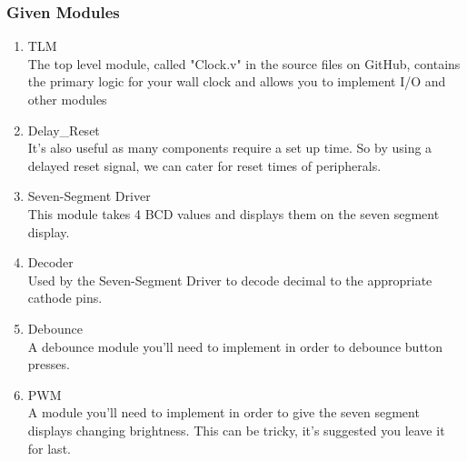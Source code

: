 \subsubsection{Given Modules}
\begin{enumerate}
    \item TLM\\
    The top level module, called "Clock.v" in the source files on GitHub, contains the primary logic for your wall clock and allows you to implement I/O and other modules
    \item Delay\_Reset\\
     It's also useful as many components require a set up time. So by using a delayed reset signal, we can cater for reset times of peripherals.
    \item Seven-Segment Driver\\
    This module takes 4 BCD values and displays them on the seven segment display.
    \item Decoder\\
    Used by the Seven-Segment Driver to decode decimal to the appropriate cathode pins.
    \item Debounce\\
    A debounce module you'll need to implement in order to debounce button presses.
    \item PWM\\
    A module you'll need to implement in order to give the seven segment displays changing brightness. This can be tricky, it's suggested you leave it for last.
\end{enumerate}

